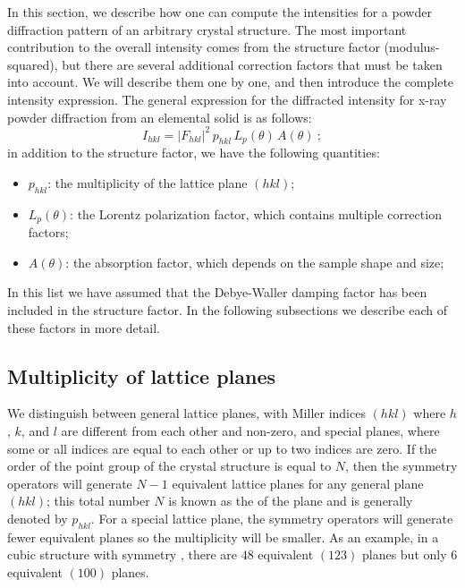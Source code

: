In this section, we describe how one can compute the intensities for a powder diffraction pattern of an arbitrary crystal structure.  The most important contribution to the overall intensity comes from the structure factor (modulus-squared), but there are several additional correction factors that must be taken into account.  We will describe them one by one, and then introduce the complete intensity expression.  The general expression for the diffracted intensity for x-ray powder diffraction from an elemental solid is as follows:
\begin{equation}
	I_{hkl} = \vert F_{hkl}\vert^2\, p_{hkl}\, L_p(\theta)\, A(\theta)\ ;\label{\chabbr:eq:Ihkl}
\end{equation}
in addition to the structure factor, we have the following quantities:
\begin{itemize}
	\item $p_{hkl}$: the multiplicity of the lattice plane $(hkl)$;
	\item $L_p(\theta)$: the Lorentz polarization factor, which contains multiple correction factors;
	\item $A(\theta)$: the absorption factor, which depends on the sample shape and size;
\end{itemize}
In this list we have assumed that the Debye-Waller damping factor has been included in the structure factor.  In the following subsections we describe each of these factors in more detail.

\subsection{Multiplicity of lattice planes}\label{\chabbr:ssec:multiplicity}
We distinguish between general lattice planes, with Miller indices $(hkl)$ where $h$, $k$, and $l$ are different from each other and non-zero, and special planes, where some or all indices are equal to each other or up to two indices are zero.  If the order of the point group of the crystal structure is equal to $N$, then the symmetry operators will generate $N-1$ equivalent lattice planes for any general plane $(hkl)$; this total number $N$ is known as the  of the plane and is generally denoted by $p_{hkl}$. For a special lattice plane, the symmetry operators will generate fewer equivalent planes so the multiplicity will be smaller.  As an example, in a cubic structure with symmetry , there are $48$ equivalent $(123)$ planes but only $6$ equivalent $(100)$ planes. 


